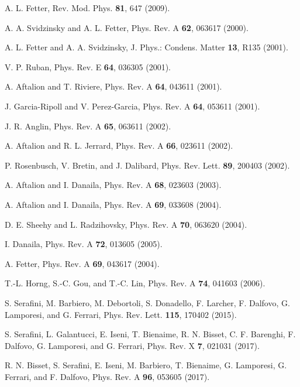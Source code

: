 \documentclass[pra,twocolumn,showpacs]{revtex4}
\begin{document}
\begin{thebibliography}{99}

  A. L. Fetter, Rev. Mod. Phys. {\bf 81}, 647 (2009).

 A. A. Svidzinsky and A. L. Fetter,
Phys. Rev. A {\bf 62}, 063617 (2000).

 A. L. Fetter and A. A. Svidzinsky,
J. Phys.: Condens. Matter {\bf 13}, R135 (2001).

 V. P. Ruban, Phys. Rev. E {\bf 64}, 036305 (2001).

 A. Aftalion and T. Riviere, Phys. Rev. A {\bf 64}, 043611 (2001).

 J. Garcia-Ripoll and V. Perez-Garcia,
Phys. Rev. A {\bf 64}, 053611 (2001).

 J. R. Anglin, Phys. Rev. A {\bf 65}, 063611 (2002).

 A. Aftalion and R. L. Jerrard, Phys. Rev. A {\bf 66}, 023611 (2002).

 P. Rosenbusch, V. Bretin, and J. Dalibard,
Phys. Rev. Lett. {\bf 89}, 200403 (2002).

 A. Aftalion and I. Danaila, Phys. Rev. A {\bf 68}, 023603 (2003).

 A. Aftalion and I. Danaila, Phys. Rev. A {\bf 69}, 033608 (2004).

 D. E. Sheehy and L. Radzihovsky, Phys. Rev. A {\bf 70}, 063620 (2004).

 I. Danaila, Phys. Rev. A {\bf 72}, 013605 (2005).

 A. Fetter, Phys. Rev. A {\bf 69}, 043617 (2004).

 T.-L. Horng, S.-C. Gou, and T.-C. Lin,
Phys. Rev. A {\bf 74}, 041603 (2006).

 S. Serafini, M. Barbiero, M. Debortoli, S. Donadello, F. Larcher, F. Dalfovo, 
G. Lamporesi, and G. Ferrari, Phys. Rev. Lett. {\bf 115}, 170402 (2015).

S. Serafini, L. Galantucci, E. Iseni, T. Bienaime, R. N. Bisset, C. F. Barenghi, F. Dalfovo, 
G. Lamporesi, and G. Ferrari, Phys. Rev. X {\bf 7}, 021031 (2017).

 R. N. Bisset, S. Serafini, E. Iseni, M. Barbiero, T. Bienaime, G. Lamporesi, 
G. Ferrari, and F. Dalfovo, Phys. Rev. A {\bf 96}, 053605 (2017).


\end{thebibliography}
\end{document}
